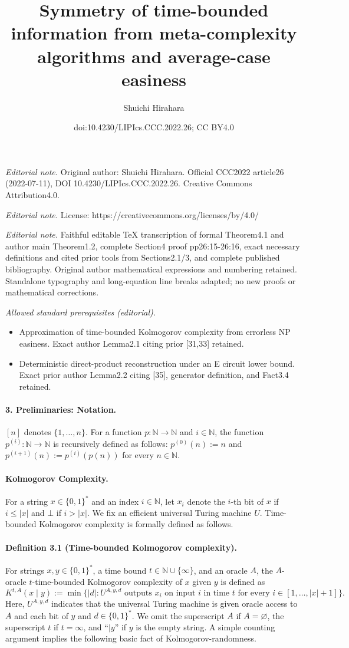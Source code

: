 \documentclass[10pt,a4paper]{article}
\title{Symmetry of time-bounded information from meta-complexity algorithms and average-case easiness}
\author{Shuichi Hirahara}
\date{doi:10.4230/LIPIcs.CCC.2022.26; CC BY4.0}
\begin{document}
\maketitle
\noindent\textit{Editorial note.} Original author: Shuichi Hirahara. Official CCC2022 article26 (2022-07-11), DOI 10.4230/LIPIcs.CCC.2022.26. Creative Commons Attribution4.0.\par\medskip
\noindent\textit{Editorial note.} License: https://creativecommons.org/licenses/by/4.0/\par\medskip
\noindent\textit{Editorial note.} Faithful editable TeX transcription of formal Theorem4.1 and author main Theorem1.2, complete Section4 proof pp26:15-26:16, exact necessary definitions and cited prior tools from Sections2.1/3, and complete published bibliography. Original author mathematical expressions and numbering retained. Standalone typography and long-equation line breaks adapted; no new proofs or mathematical corrections.\par\medskip
\noindent\textit{Allowed standard prerequisites (editorial).}\begin{itemize}
\item Approximation of time-bounded Kolmogorov complexity from errorless NP easiness. Exact author Lemma2.1 citing prior [31,33] retained.
\item Deterministic direct-product reconstruction under an E circuit lower bound. Exact prior author Lemma2.2 citing [35], generator definition, and Fact3.4 retained.
\end{itemize}\medskip
\paragraph{3. Preliminaries: Notation.}
$[n]$ denotes $\{1,\ldots,n\}$. For a function $p:\mathbb N\to\mathbb N$ and $i\in\mathbb N$, the function $p^{(i)}:\mathbb N\to\mathbb N$ is recursively defined as follows: $p^{(0)}(n):=n$ and $p^{(i+1)}(n):=p^{(i)}(p(n))$ for every $n\in\mathbb N$.
\paragraph{Kolmogorov Complexity.}
For a string $x\in\{0,1\}^*$ and an index $i\in\mathbb N$, let $x_i$ denote the $i$-th bit of $x$ if $i\leq|x|$ and $\bot$ if $i>|x|$. We fix an efficient universal Turing machine $U$. Time-bounded Kolmogorov complexity is formally defined as follows.
\paragraph{Definition 3.1 (Time-bounded Kolmogorov complexity).}
For strings $x,y\in\{0,1\}^*$, a time bound $t\in\mathbb N\cup\{\infty\}$, and an oracle $A$, the $A$-oracle $t$-time-bounded Kolmogorov complexity of $x$ given $y$ is defined as
\[K^{t,A}(x\mid y):=\min\{|d|:U^{A,y,d}\text{ outputs }x_i\text{ on input }i\text{ in time }t\text{ for every }i\in[1,\ldots,|x|+1]\}.\]
Here, $U^{A,y,d}$ indicates that the universal Turing machine is given oracle access to $A$ and each bit of $y$ and $d\in\{0,1\}^*$. We omit the superscript $A$ if $A=\varnothing$, the superscript $t$ if $t=\infty$, and ``$\mid y$'' if $y$ is the empty string.
A simple counting argument implies the following basic fact of Kolmogorov-randomness.
\end{document}
